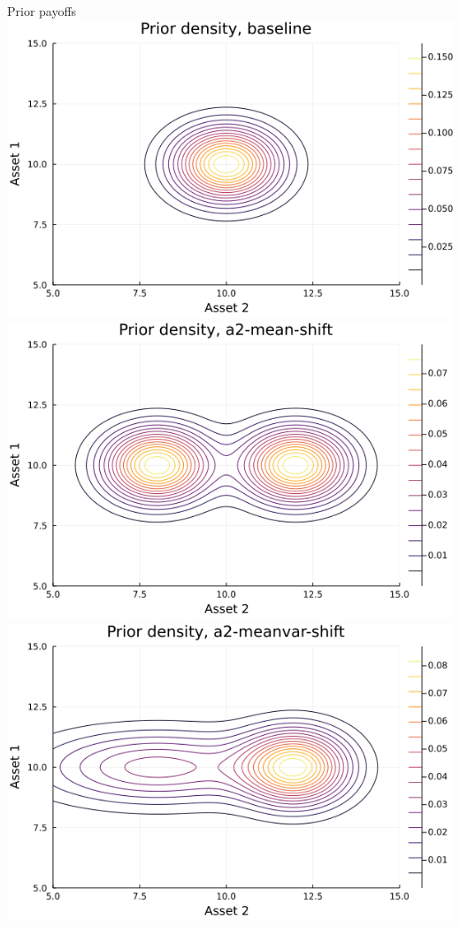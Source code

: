 \documentclass[
  ignorenonframetext,
]{beamer}
\begin{document}
\begin{frame}{Prior payoffs}
\protect\hypertarget{prior-payoffs}{}
\includegraphics[width=0.5\paperheight]{complexity_files/figure-beamer/unnamed-chunk-10-1}
\includegraphics[width=0.5\paperheight]{complexity_files/figure-beamer/unnamed-chunk-10-2}
\includegraphics[width=0.5\paperheight]{complexity_files/figure-beamer/unnamed-chunk-10-3}

\end{frame}
\end{document}
